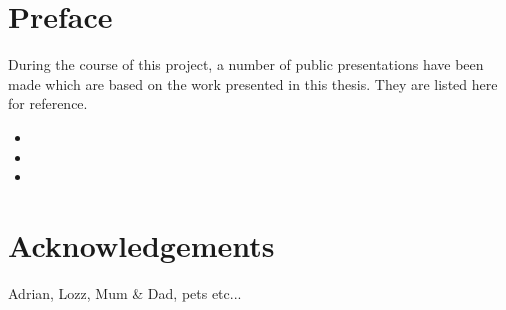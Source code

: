 \documentclass[a4paper,twoside,12pt,openany]{book}
\begin{document}
\chapter*{Preface} %
During the course of this project, a number of public presentations have been made which are based on the work
presented in this thesis. They are listed here for reference.
\nobibliography*
\begin{itemize}
\item {}
\item {}
\item {}
\end{itemize}


\chapter*{Acknowledgements} %

Adrian, Lozz, Mum \& Dad, pets etc...

\singlespace    %
\tableofcontents

\newpage
{}










\singlespace




\end{document}
